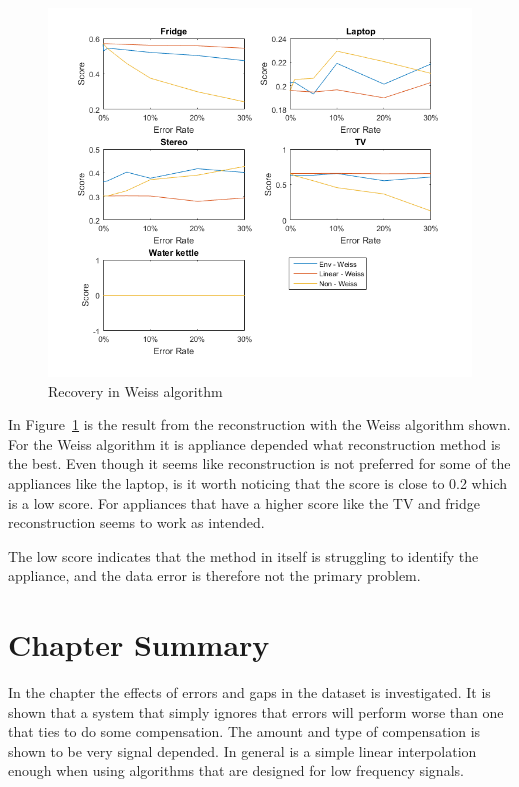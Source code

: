 \newpage
\begin{figure}[H]
\centering
\includegraphics[width=1\textwidth]{billeder/Rec-Weiss.png}
\caption{Recovery in Weiss algorithm}
\label{fig:ERWEISS}
\end{figure}

In Figure~\ref{fig:ERWEISS} is the result from the reconstruction with the Weiss algorithm shown. For the Weiss algorithm it is appliance depended what reconstruction method is the best. Even though it seems like reconstruction is not preferred for some of the appliances like the laptop, is it worth noticing that the score is close to 0.2 which is a low score. For appliances that have a higher score like the TV and fridge reconstruction seems to work as intended.

The low score indicates that the method in itself is struggling to identify the appliance, and the data error is therefore not the primary problem.  


\newpage
\section{Chapter Summary}
In the chapter the effects of errors and gaps in the dataset is investigated. It is shown that a system that simply ignores that errors will perform worse than one that ties to do some compensation. The amount and type of compensation is shown to be very signal depended. In general is a simple linear interpolation enough when using algorithms that are designed for low frequency signals. 

